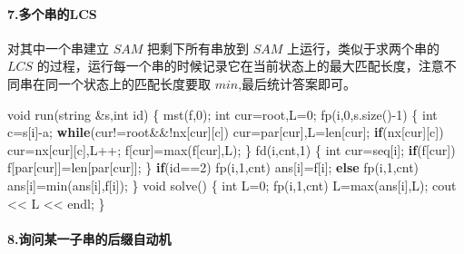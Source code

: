 \documentclass[
]{article}
\newenvironment{Shaded}{}{}
\newcommand{\CharTok}[1]{\textcolor[rgb]{0.25,0.44,0.63}{#1}}
\newcommand{\ControlFlowTok}[1]{\textcolor[rgb]{0.00,0.44,0.13}{\textbf{#1}}}
\newcommand{\DataTypeTok}[1]{\textcolor[rgb]{0.56,0.13,0.00}{#1}}
\newcommand{\DecValTok}[1]{\textcolor[rgb]{0.25,0.63,0.44}{#1}}
\newcommand{\NormalTok}[1]{#1}
\begin{document}
\hypertarget{ux591aux4e2aux4e32ux7684lcs}{%
\paragraph{7.多个串的LCS}\label{ux591aux4e2aux4e32ux7684lcs}}

对其中一个串建立 \(SAM\) 把剩下所有串放到 \(SAM\)
上运行，类似于求两个串的 \(LCS\)
的过程，运行每一个串的时候记录它在当前状态上的最大匹配长度，注意不同串在同一个状态上的匹配长度要取
\(min\),最后统计答案即可。

\begin{Shaded}
\begin{Highlighting}[]
\DataTypeTok{void}\NormalTok{ run(string \&s,}\DataTypeTok{int}\NormalTok{ id)}
\NormalTok{\{}
\NormalTok{    mst(f,}\DecValTok{0}\NormalTok{);}
    \DataTypeTok{int}\NormalTok{ cur=root,L=}\DecValTok{0}\NormalTok{;}
\NormalTok{    fp(i,}\DecValTok{0}\NormalTok{,s.size(){-}}\DecValTok{1}\NormalTok{)}
\NormalTok{    \{}
        \DataTypeTok{int}\NormalTok{ c=s[i]{-}}\CharTok{\textquotesingle{}a\textquotesingle{}}\NormalTok{;}
        \ControlFlowTok{while}\NormalTok{(cur!=root\&\&!nx[cur][c])}
\NormalTok{            cur=par[cur],L=len[cur];}
        \ControlFlowTok{if}\NormalTok{(nx[cur][c]) cur=nx[cur][c],L++;}
\NormalTok{        f[cur]=max(f[cur],L);}
\NormalTok{    \}}
\NormalTok{    fd(i,cnt,}\DecValTok{1}\NormalTok{)}
\NormalTok{    \{}
        \DataTypeTok{int}\NormalTok{ cur=seq[i];}
        \ControlFlowTok{if}\NormalTok{(f[cur]) f[par[cur]]=len[par[cur]];}
\NormalTok{    \}}
    \ControlFlowTok{if}\NormalTok{(id==}\DecValTok{2}\NormalTok{) fp(i,}\DecValTok{1}\NormalTok{,cnt) ans[i]=f[i];}
    \ControlFlowTok{else}\NormalTok{ fp(i,}\DecValTok{1}\NormalTok{,cnt) ans[i]=min(ans[i],f[i]);}
\NormalTok{\}}
\DataTypeTok{void}\NormalTok{ solve()}
\NormalTok{\{}
    \DataTypeTok{int}\NormalTok{ L=}\DecValTok{0}\NormalTok{;}
\NormalTok{    fp(i,}\DecValTok{1}\NormalTok{,cnt) L=max(ans[i],L);}
\NormalTok{    cout \textless{}\textless{} L \textless{}\textless{} endl;}
\NormalTok{\}}
\end{Highlighting}
\end{Shaded}

\hypertarget{ux8be2ux95eeux67d0ux4e00ux5b50ux4e32ux7684ux540eux7f00ux81eaux52a8ux673a}{%
\paragraph{8.询问某一子串的后缀自动机}\label{ux8be2ux95eeux67d0ux4e00ux5b50ux4e32ux7684ux540eux7f00ux81eaux52a8ux673a}}
\end{document}
